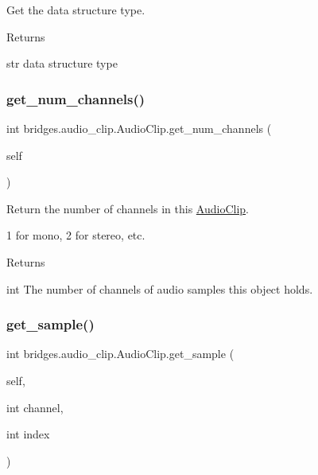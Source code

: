 Get the data structure type. 

\begin{DoxyReturn}{Returns}


str data structure type 
\end{DoxyReturn}
\mbox{\label{classbridges_1_1audio__clip_1_1_audio_clip_ad04346faa0d3bcb18028847a2b9c8617}} 
\subsubsection{\texorpdfstring{get\_num\_channels()}{get\_num\_channels()}}
{\footnotesize\ttfamily  int bridges.\+audio\+\_\+clip.\+Audio\+Clip.\+get\+\_\+num\+\_\+channels (\begin{DoxyParamCaption}\item[{}]{self }\end{DoxyParamCaption})}



Return the number of channels in this \mbox{\hyperlink{classbridges_1_1audio__clip_1_1_audio_clip}{Audio\+Clip}}. 

1 for mono, 2 for stereo, etc. \begin{DoxyReturn}{Returns}


int The number of channels of audio samples this object holds. 
\end{DoxyReturn}
\mbox{\label{classbridges_1_1audio__clip_1_1_audio_clip_a024523f9e67156818aa1c166f2f18fba}} 
\subsubsection{\texorpdfstring{get\_sample()}{get\_sample()}}
{\footnotesize\ttfamily  int bridges.\+audio\+\_\+clip.\+Audio\+Clip.\+get\+\_\+sample (\begin{DoxyParamCaption}\item[{}]{self,  }\item[{int}]{channel,  }\item[{int}]{index }\end{DoxyParamCaption})}



